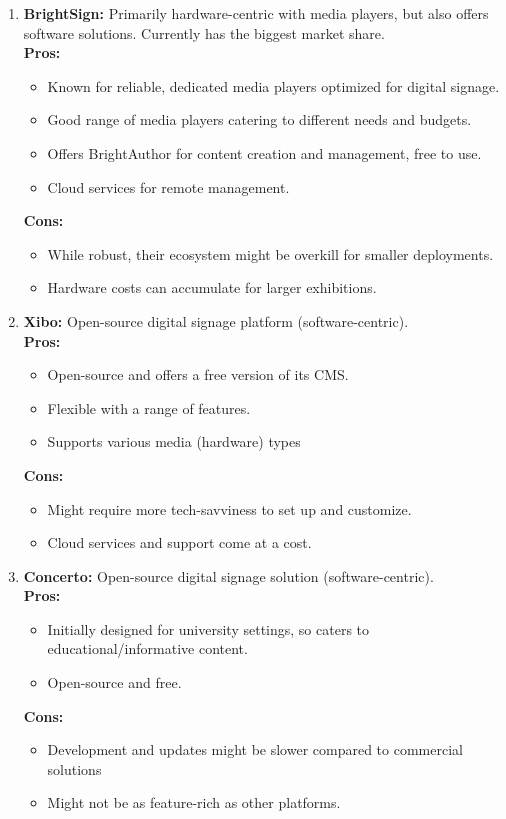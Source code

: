 \documentclass{exam}
\begin{document}
\begin{enumerate}
\item \textbf{BrightSign:} Primarily hardware-centric with media players, but also offers software solutions. Currently has the biggest market share.\\
\bigskip
\textbf{Pros:}\\
\begin{itemize}
\item Known for reliable, dedicated media players optimized for digital signage.
\item Good range of media players catering to different needs and budgets.
\item Offers BrightAuthor for content creation and management, free to use.
\item Cloud services for remote management.
\end{itemize}
\textbf{Cons:}\\
\begin{itemize}
\item While robust, their ecosystem might be overkill for smaller deployments.
\item Hardware costs can accumulate for larger exhibitions.
\end{itemize}
\bigskip


\item \textbf{Xibo:} Open-source digital signage platform (software-centric).\\
\bigskip
\textbf{Pros:}\\
\begin{itemize}
\item Open-source and offers a free version of its CMS.
\item Flexible with a range of features.
\item Supports various media (hardware) types
\end{itemize}
\textbf{Cons:}\\
\begin{itemize}
\item Might require more tech-savviness to set up and customize.
\item Cloud services and support come at a cost.
\end{itemize}

\pagebreak
\item \textbf{Concerto:} Open-source digital signage solution (software-centric).\\
\bigskip
\textbf{Pros:}\\
\begin{itemize}
\item Initially designed for university settings, so caters to educational/informative content.
\item Open-source and free.
\end{itemize}
\textbf{Cons:}\\
\begin{itemize}
\item Development and updates might be slower compared to commercial solutions
\item Might not be as feature-rich as other platforms.
\end{itemize}
\bigskip
\bigskip


\end{enumerate}
\end{document}
